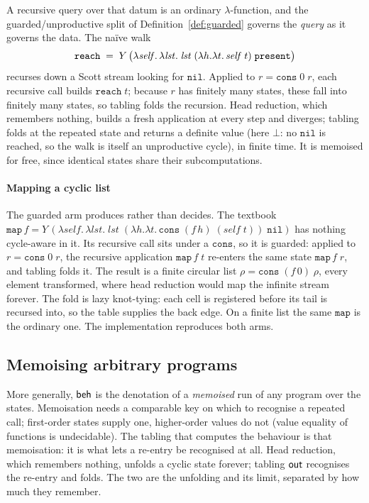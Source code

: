 A recursive query over that datum is an ordinary $\lambda$-function, and the guarded/unproductive
split of Definition~\ref{def:guarded} governs the \emph{query} as it governs the data. The na\"ive
walk
\[
  \mathtt{reach} \;=\; Y\,\big(\lambda\mathit{self}.\,\lambda\mathit{lst}.\;
  \mathit{lst}\;(\lambda h.\lambda t.\,\mathit{self}\;t)\;\mathtt{present}\big)
\]
recurses down a Scott stream looking for $\mathtt{nil}$. Applied to $r = \mathtt{cons}\;0\;r$, each
recursive call builds $\mathtt{reach}\;t$; because $r$ has finitely many states, these fall into
finitely many states, so tabling folds the recursion. Head reduction, which remembers nothing,
builds a fresh application at every step and diverges; tabling folds at the repeated state and
returns a definite value (here $\bot$: no $\mathtt{nil}$ is reached, so the walk is itself an
unproductive cycle), in finite time. It is memoised for free, since identical states share their
subcomputations.

\paragraph{Mapping a cyclic list}
The guarded arm produces rather than decides. The textbook
$\mathtt{map}\,f = Y\,(\lambda\mathit{self}.\,\lambda\mathit{lst}.\;\mathit{lst}\;
(\lambda h.\lambda t.\,\mathtt{cons}\;(f\,h)\;(\mathit{self}\;t))\;\mathtt{nil})$ has nothing
cycle-aware in it. Its recursive call sits under a $\mathtt{cons}$, so it is guarded: applied to
$r = \mathtt{cons}\;0\;r$, the recursive application $\mathtt{map}\,f\;t$ re-enters the same state
$\mathtt{map}\,f\;r$, and tabling folds it. The result is a finite circular list
$\rho = \mathtt{cons}\;(f\,0)\;\rho$, every element transformed, where head reduction would map the
infinite stream forever. The fold is lazy knot-tying: each cell is registered before its tail is
recursed into, so the table supplies the back edge. On a finite list the same $\mathtt{map}$ is the
ordinary one. The implementation reproduces
both arms.

\subsection{Memoising arbitrary programs}\label{sec:memo}
More generally, $\mathsf{beh}$ is the denotation of a \emph{memoised} run of any program over the states.
Memoisation needs a comparable key on which to recognise a repeated call; first-order states supply
one, higher-order values do not (value equality of functions is undecidable). The tabling that computes the behaviour
is that memoisation: it is what lets a re-entry be recognised at all. Head reduction, which remembers
nothing, unfolds a cyclic state forever; tabling $\mathsf{out}$ recognises the re-entry and folds. The two
are the unfolding and its limit, separated by how much they remember.

